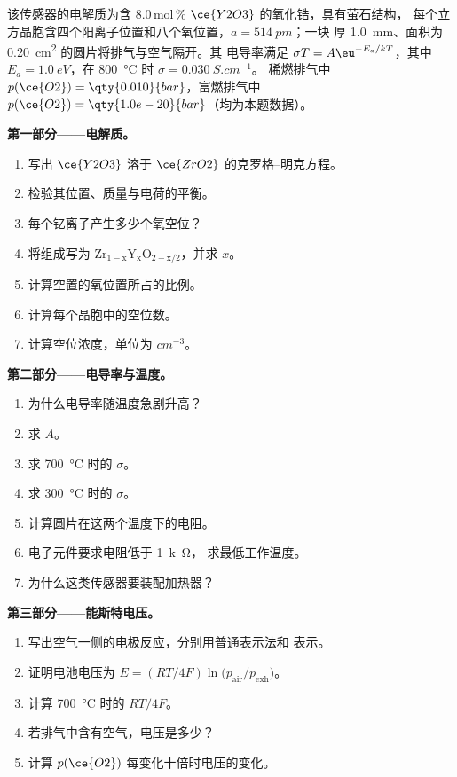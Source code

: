 \begin{problem}
\label{pb:b3:solid-state:1}
该传感器的电解质为含 8.0\,mol\,\% $\ce{Y2O3}$ 的氧化锆，具有萤石结构，
每个立方晶胞含四个阳离子位置和八个氧位置，$a = \qty{514}{pm}$；一块
厚 \qty{1.0}{mm}、面积为 \qty{0.20}{cm^2} 的圆片将排气与空气隔开。其
电导率满足 $\sigma T = A\eu^{-E_a/kT}$，其中 $E_a = \qty{1.0}{eV}$，在 \qty{800}{\celsius} 时 $\sigma = \qty{0.030}{S.cm^{-1}}$。
稀燃排气中 $p(\ce{O2}) = \qty{0.010}{bar}$，富燃排气中 $p(\ce{O2}) = \qty{1.0e-20}{bar}$（均为本题数据）。

\medskip\noindent\textbf{第一部分——电解质。}
\begin{enumerate}
  \item 写出 $\ce{Y2O3}$ 溶于 $\ce{ZrO2}$ 的克罗格–明克方程。
  \item 检验其位置、质量与电荷的平衡。
  \item 每个钇离子产生多少个氧空位？
  \item 将组成写为 $\mathrm{Zr_{1-x}Y_xO_{2-x/2}}$，并求 $x$。
  \item 计算空置的氧位置所占的比例。
  \item 计算每个晶胞中的空位数。
  \item 计算空位浓度，单位为 $\unit{cm^{-3}}$。
\end{enumerate}

\medskip\noindent\textbf{第二部分——电导率与温度。}
\begin{enumerate}[resume]
  \item 为什么电导率随温度急剧升高？
  \item 求 $A$。
  \item 求 \qty{700}{\celsius} 时的 $\sigma$。
  \item 求 \qty{300}{\celsius} 时的 $\sigma$。
  \item 计算圆片在这两个温度下的电阻。
  \item 电子元件要求电阻低于 \qty{1}{k\ohm}，
        求最低工作温度。
  \item 为什么这类传感器要装配加热器？
\end{enumerate}

\medskip\noindent\textbf{第三部分——能斯特电压。}
\begin{enumerate}[resume]
  \item 写出空气一侧的电极反应，分别用普通表示法和
        表示。
  \item 证明电池电压为 $E = (RT/4F)\ln\bigl(p_{\mathrm{air}}/p_{\mathrm{exh}}\bigr)$。
  \item 计算 \qty{700}{\celsius} 时的 $RT/4F$。
  \item 若排气中含有空气，电压是多少？
  \item 计算 $p(\ce{O2})$ 每变化十倍时电压的变化。
\end{enumerate}


\end{problem}
